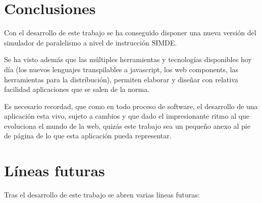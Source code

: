 \section{Conclusiones}
\label{7:sec1}

Con el desarrollo de este trabajo se ha conseguido disponer una nueva versión
del simulador de paralelismo a nivel de instrucción SIMDE.

Se ha visto además que las múltiples herramientas y tecnologías disponibles hoy
día (los nuevos lenguajes transpilables a javascript, los web components, las 
herramientas para la distribución), permiten elaborar y diseñar con relativa
facilidad aplicaciones que se salen de la norma.

Es necesario recordad, que como en todo proceso de software, el desarrollo de una 
aplicación esta vivo, sujeto a cambios y que dado el impresionante ritmo al que
evoluciona el mundo de la web, quizás este trabajo sea un pequeño anexo al pie 
de página de lo que esta aplicación pueda representar.

\section{Líneas futuras}
\label{7:sec2}

Tras el desarrollo de este trabajo se abren varias líneas futuras: 

